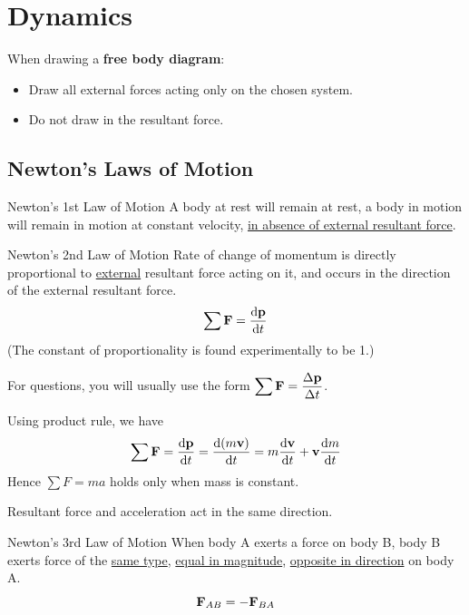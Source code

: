 \section{Dynamics}
When drawing a \textbf{free body diagram}:
\begin{itemize}
	\item Draw all external forces acting only on the chosen system.
	\item Do not draw in the resultant force.
\end{itemize}

\subsection{Newton's Laws of Motion}
\begin{defn}{Newton's 1st Law of Motion}{}
A body at rest will remain at rest, a body in motion will remain in motion at constant velocity, \underline{in absence of external resultant force}. 
\end{defn} 

\begin{defn}{Newton's 2nd Law of Motion}{}
Rate of change of momentum is directly proportional to \underline{external} resultant force acting on it, and occurs in the direction of the external resultant force. 
\begin{equation} \sum \vb{F} = \dv{\vb{p}}{t} \end{equation}
(The constant of proportionality is found experimentally to be 1.)
\end{defn}

\begin{remark}
For questions, you will usually use the form $\displaystyle\sum\vb{F}=\frac{\Delta\vb{p}}{\Delta t}$.
\end{remark}

\begin{remark}
Using product rule, we have 
\[ \sum \vb{F}=\dv{\vb{p}}{t}=\dv{(m\vb{v})}{t}=m\dv{\vb{v}}{t}+\vb{v}\dv{m}{t} \]
Hence $\sum F = ma$ holds only when mass is constant.
\end{remark}

\begin{remark}
Resultant force and acceleration act in the same direction.
\end{remark}

\begin{defn}{Newton's 3rd Law of Motion}{}
When body A exerts a force on body B, body B exerts force of the \underline{same type}, \underline{equal in magnitude}, \underline{opposite in direction} on body A. 
\begin{equation} \vb{F}_{AB} = - \vb{F}_{BA} \end{equation}
\end{defn}

